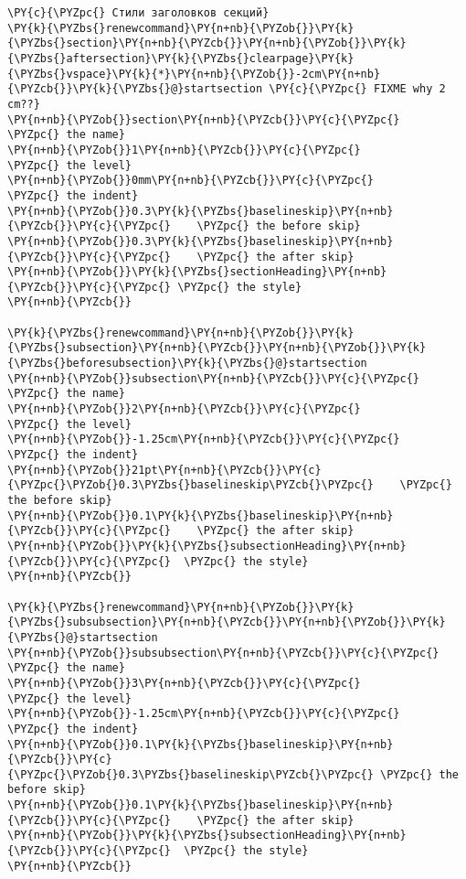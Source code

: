 \begin{Verbatim}[commandchars=\\\{\}]
\PY{c}{\PYZpc{} Стили заголовков секций}
\PY{k}{\PYZbs{}renewcommand}\PY{n+nb}{\PYZob{}}\PY{k}{\PYZbs{}section}\PY{n+nb}{\PYZcb{}}\PY{n+nb}{\PYZob{}}\PY{k}{\PYZbs{}aftersection}\PY{k}{\PYZbs{}clearpage}\PY{k}{\PYZbs{}vspace}\PY{k}{*}\PY{n+nb}{\PYZob{}}-2cm\PY{n+nb}{\PYZcb{}}\PY{k}{\PYZbs{}@}startsection \PY{c}{\PYZpc{} FIXME why 2 cm??}
\PY{n+nb}{\PYZob{}}section\PY{n+nb}{\PYZcb{}}\PY{c}{\PYZpc{}		\PYZpc{} the name}
\PY{n+nb}{\PYZob{}}1\PY{n+nb}{\PYZcb{}}\PY{c}{\PYZpc{}			\PYZpc{} the level}
\PY{n+nb}{\PYZob{}}0mm\PY{n+nb}{\PYZcb{}}\PY{c}{\PYZpc{}			\PYZpc{} the indent}
\PY{n+nb}{\PYZob{}}0.3\PY{k}{\PYZbs{}baselineskip}\PY{n+nb}{\PYZcb{}}\PY{c}{\PYZpc{}	\PYZpc{} the before skip}
\PY{n+nb}{\PYZob{}}0.3\PY{k}{\PYZbs{}baselineskip}\PY{n+nb}{\PYZcb{}}\PY{c}{\PYZpc{}	\PYZpc{} the after skip}
\PY{n+nb}{\PYZob{}}\PY{k}{\PYZbs{}sectionHeading}\PY{n+nb}{\PYZcb{}}\PY{c}{\PYZpc{}	\PYZpc{} the style}
\PY{n+nb}{\PYZcb{}}

\PY{k}{\PYZbs{}renewcommand}\PY{n+nb}{\PYZob{}}\PY{k}{\PYZbs{}subsection}\PY{n+nb}{\PYZcb{}}\PY{n+nb}{\PYZob{}}\PY{k}{\PYZbs{}beforesubsection}\PY{k}{\PYZbs{}@}startsection
\PY{n+nb}{\PYZob{}}subsection\PY{n+nb}{\PYZcb{}}\PY{c}{\PYZpc{}		\PYZpc{} the name}
\PY{n+nb}{\PYZob{}}2\PY{n+nb}{\PYZcb{}}\PY{c}{\PYZpc{}				\PYZpc{} the level}
\PY{n+nb}{\PYZob{}}-1.25cm\PY{n+nb}{\PYZcb{}}\PY{c}{\PYZpc{}			\PYZpc{} the indent}
\PY{n+nb}{\PYZob{}}21pt\PY{n+nb}{\PYZcb{}}\PY{c}{\PYZpc{}\PYZob{}0.3\PYZbs{}baselineskip\PYZcb{}\PYZpc{}	\PYZpc{} the before skip}
\PY{n+nb}{\PYZob{}}0.1\PY{k}{\PYZbs{}baselineskip}\PY{n+nb}{\PYZcb{}}\PY{c}{\PYZpc{}	\PYZpc{} the after skip}
\PY{n+nb}{\PYZob{}}\PY{k}{\PYZbs{}subsectionHeading}\PY{n+nb}{\PYZcb{}}\PY{c}{\PYZpc{}	\PYZpc{} the style}
\PY{n+nb}{\PYZcb{}}

\PY{k}{\PYZbs{}renewcommand}\PY{n+nb}{\PYZob{}}\PY{k}{\PYZbs{}subsubsection}\PY{n+nb}{\PYZcb{}}\PY{n+nb}{\PYZob{}}\PY{k}{\PYZbs{}@}startsection 
\PY{n+nb}{\PYZob{}}subsubsection\PY{n+nb}{\PYZcb{}}\PY{c}{\PYZpc{}	\PYZpc{} the name}
\PY{n+nb}{\PYZob{}}3\PY{n+nb}{\PYZcb{}}\PY{c}{\PYZpc{}			\PYZpc{} the level}
\PY{n+nb}{\PYZob{}}-1.25cm\PY{n+nb}{\PYZcb{}}\PY{c}{\PYZpc{}			\PYZpc{} the indent}
\PY{n+nb}{\PYZob{}}0.1\PY{k}{\PYZbs{}baselineskip}\PY{n+nb}{\PYZcb{}}\PY{c}{\PYZpc{}\PYZob{}0.3\PYZbs{}baselineskip\PYZcb{}\PYZpc{}	\PYZpc{} the before skip}
\PY{n+nb}{\PYZob{}}0.1\PY{k}{\PYZbs{}baselineskip}\PY{n+nb}{\PYZcb{}}\PY{c}{\PYZpc{}	\PYZpc{} the after skip}
\PY{n+nb}{\PYZob{}}\PY{k}{\PYZbs{}subsectionHeading}\PY{n+nb}{\PYZcb{}}\PY{c}{\PYZpc{}	\PYZpc{} the style}
\PY{n+nb}{\PYZcb{}}


\end{Verbatim}
